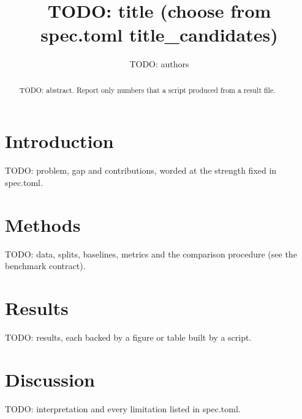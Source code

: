 \documentclass[11pt]{article}
\title{TODO: title (choose from spec.toml title\_candidates)}
\author{TODO: authors}
\date{}
\begin{document}
\maketitle

\begin{abstract}
TODO: abstract. Report only numbers that a script produced from a result file.
\end{abstract}

\section{Introduction}\label{sec:intro}
TODO: problem, gap and contributions, worded at the strength fixed in spec.toml.

\section{Methods}\label{sec:methods}
TODO: data, splits, baselines, metrics and the comparison procedure (see the benchmark contract).

\section{Results}\label{sec:results}
TODO: results, each backed by a figure or table built by a script.

\section{Discussion}\label{sec:discussion}
TODO: interpretation and every limitation listed in spec.toml.



\end{document}
